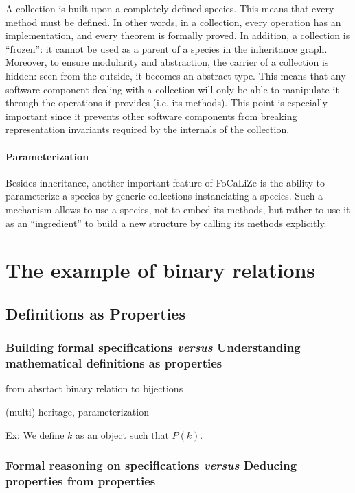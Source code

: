 \documentclass[submission,copyright,creativecommons]{eptcs}
\def\focalize{FoCaLiZe \mbox{}}
\begin{document}
A collection is built upon a completely defined species. This means
that every method must be defined. In other words, in a collection, every 
operation has an implementation, and every theorem is formally proved.
In addition, a collection is ``frozen'': it cannot be used as a parent
of a species in the inheritance graph. Moreover, to ensure modularity
and abstraction, the carrier of a collection is hidden: seen from the
outside, it becomes an abstract type. This means
that any software component dealing with a collection will only be
able to manipulate it through the operations it
provides (i.e. its methods). This point is especially important since
it prevents other
software components from breaking representation invariants required by the
internals of the collection.

\paragraph{Parameterization}

Besides inheritance, another important feature of \focalize is the ability to
parameterize a species by generic collections instanciating a species. Such a
mechanism allows to use a species, not to embed its methods, but rather to
use it as an ``ingredient'' to build a new structure by calling its methods
explicitly.




\section{The example of binary relations}

\subsection{Definitions as Properties}

\subsubsection{Building formal specifications {\it versus} Understanding
  mathematical definitions as properties}

from absrtact binary relation to bijections

(multi)-heritage, parameterization


Ex: We define $k$ as an object such that $P(k)$.

\subsubsection{Formal reasoning on specifications {\it versus} Deducing
  properties from properties}
\end{document}
